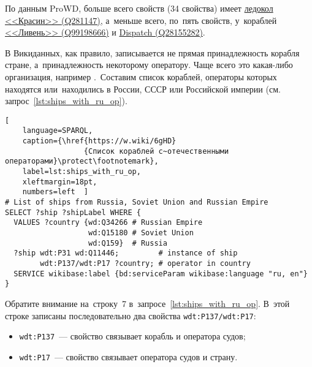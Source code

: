 \newpage
По данным ProWD, больше всего свойств (34 свойства) имеет 
\href{https://www.wikidata.org/wiki/Q281147}{ледокол <<Красин>> (Q281147)}, 
а~меньше всего, по~пять свойств, у~кораблей 
\href{https://www.wikidata.org/wiki/Q99198666}{<<Ливень>> (Q99198666)} и 
\href{https://www.wikidata.org/wiki/Q28155282}{Dispatch (Q28155282)}.

В Викиданных, как правило, записывается не прямая принадлежность корабля стране, 
а~принадлежность некоторому оператору. 
Чаще всего это какая-либо организация, 
например 
.\, 
Составим список кораблей, 
операторы которых находятся или~находились в России, СССР или Российской империи 
(см. запрос~\ref{lst:ships_with_ru_op}). 



\begin{lstlisting}[ 
    language=SPARQL, 
    caption={\href{https://w.wiki/6gHD}
                  {Cписок кораблей с~отечественными операторами}\protect\footnotemark}, 
    label=lst:ships_with_ru_op,
    xleftmargin=18pt, 
    numbers=left  ]
# List of ships from Russia, Soviet Union and Russian Empire
SELECT ?ship ?shipLabel WHERE {
  VALUES ?country {wd:Q34266 # Russian Empire
                   wd:Q15180 # Soviet Union
                   wd:Q159}  # Russia
  ?ship wdt:P31 wd:Q11446;         # instance of ship
        wdt:P137/wdt:P17 ?country; # operator in country
  SERVICE wikibase:label {bd:serviceParam wikibase:language "ru, en"}
}
\end{lstlisting}

\noindent Обратите внимание на~строку~7 в~запросе~\ref{lst:ships_with_ru_op}. 
В~этой строке записаны последовательно два свойства \texttt{wdt:P137/wdt:P17}:
\begin{itemize}
	\item \texttt{wdt:P137}~--- свойство  связывает корабль и оператора судов;
	\item \texttt{wdt:P17}~--- свойство  связывает оператора судов и страну.
\end{itemize}

